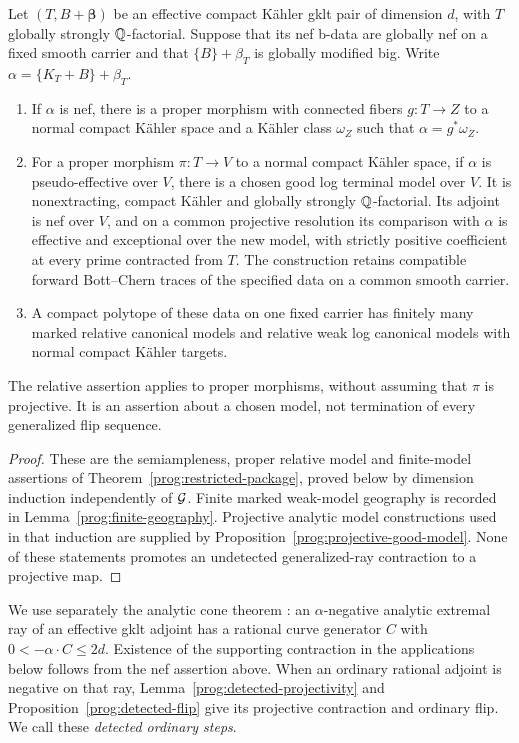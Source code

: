 \begin{proposition}\label{prog:mori}
Let \((T,B+\boldsymbol\beta)\) be an effective compact Kähler gklt
pair of dimension \(d\), with \(T\) globally strongly
\(\mathbb Q\)-factorial. Suppose that its nef b-data are globally nef on a
fixed smooth carrier and that \(\{B\}+\beta_T\) is globally
modified big. Write \(\alpha=\{K_T+B\}+\beta_T\).
\begin{enumerate}
\item If \(\alpha\) is nef, there is a proper morphism with connected
fibers \(g:T\to Z\) to a normal compact Kähler space and a Kähler
class \(\omega_Z\) such that \(\alpha=g^*\omega_Z\).
\item For a proper morphism \(\pi:T\to V\) to a normal compact
Kähler space, if \(\alpha\) is pseudo-effective over \(V\), there
is a chosen good log terminal model over \(V\). It is nonextracting,
compact Kähler and globally strongly \(\mathbb Q\)-factorial. Its adjoint
is nef over \(V\), and on a common projective resolution its comparison
with \(\alpha\) is effective and exceptional over the new model,
with strictly positive coefficient at every prime contracted from \(T\).
The construction retains compatible forward Bott--Chern traces of the
specified data on a common smooth carrier.
\item A compact polytope of these data on one fixed carrier has
finitely many marked relative canonical models and relative weak log
canonical models with normal compact Kähler targets.
\end{enumerate}
The relative assertion applies to proper morphisms, without assuming
that \(\pi\) is projective. It is an assertion about a chosen model,
not termination of every generalized flip sequence.
\end{proposition}

\begin{proof}
These are the semiampleness, proper relative model and finite-model
assertions of Theorem~\ref{prog:restricted-package}, proved below
by dimension induction independently of \(\mathcal G\).
Finite marked weak-model geography is recorded in
Lemma~\ref{prog:finite-geography}. Projective analytic model
constructions used in that induction are supplied by
Proposition~\ref{prog:projective-good-model}. None of these statements
promotes an undetected generalized-ray contraction to a projective map.
\end{proof}

We use separately the analytic cone theorem
\cite[Theorem~1.3]{HX}: an \(\alpha\)-negative analytic extremal ray
of an effective gklt adjoint has a rational curve generator \(C\) with
\(0<-\alpha\cdot C\leq2d\). Existence of the supporting contraction
in the applications below follows from the nef assertion above.
When an ordinary rational adjoint is negative on that ray,
Lemma~\ref{prog:detected-projectivity} and
Proposition~\ref{prog:detected-flip} give its projective contraction and ordinary
flip. We call these \emph{detected ordinary steps}.

